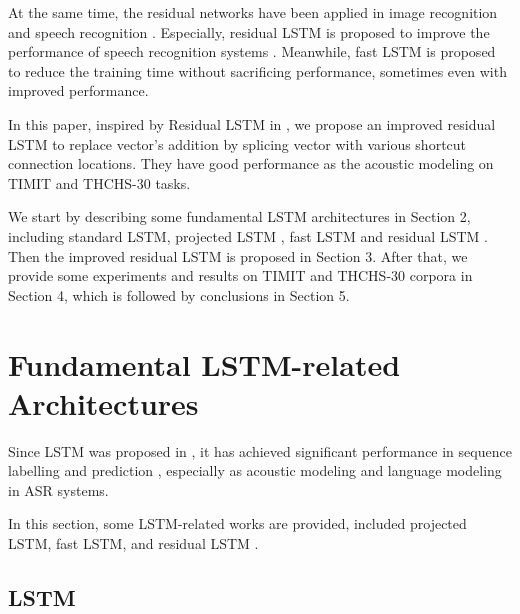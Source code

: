 \documentclass[a4paper]{article}
\begin{document}
At the same time, the residual networks have been applied in image recognition \cite{res-image} and speech recognition \cite{residual-lstm,IBM-5.5,MS-1,MS-2,res-lstm}.
Especially, residual LSTM is proposed to improve the performance of speech recognition systems \cite{residual-lstm,res-lstm}.
Meanwhile, fast LSTM \cite{fast-lstm-1,fast-lstm-2} is proposed to reduce the training time without sacrificing performance, sometimes even with improved performance.


In this paper, inspired by Residual LSTM in \cite{residual-lstm},
we propose an improved residual LSTM to replace vector's addition by splicing vector with various shortcut connection locations.
They have good performance  as the acoustic modeling on TIMIT \cite{timit} and THCHS-30 \cite{thchs30} tasks.


We start by describing some fundamental LSTM architectures in Section 2,
including standard LSTM, projected LSTM \cite{lstm-asr}, fast LSTM and residual LSTM \cite{residual-lstm}.
Then the improved residual LSTM is proposed in Section 3.
After that, we provide some experiments and results on TIMIT and THCHS-30 corpora in Section 4, which is followed by conclusions in Section 5.


  \section{Fundamental LSTM-related Architectures}
\label{sec:lstm}
Since LSTM was proposed in \cite{lstm}, it has achieved significant performance in sequence labelling and prediction \cite{seq-lab},
especially as acoustic modeling and language modeling in ASR systems.

In this section, some LSTM-related works are provided, included projected LSTM, fast LSTM, and residual LSTM \cite{residual-lstm}.

\subsection{LSTM}
\end{document}
